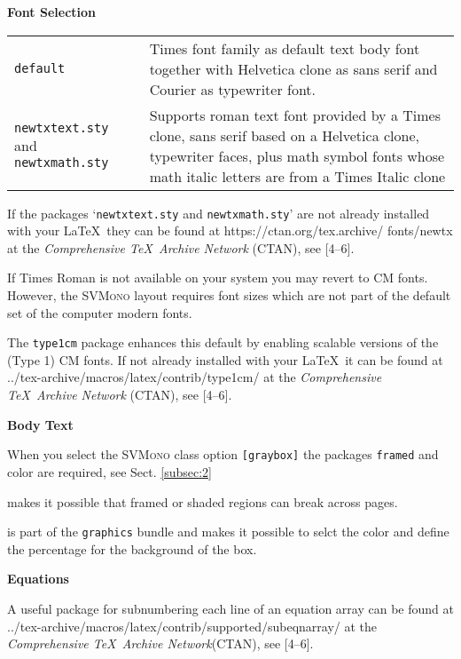 \documentclass[graybox,square]{svmono}
\begin{document}
\begin{sloppy}
\textbf{Font Selection}

\begin{tabular}{p{7.5pc}@{\qquad}p{18.5pc}}
\texttt{default} &Times font family as default text body font together with
Helvetica clone as sans serif and Courier as typewriter font.\\
\texttt{newtxtext.sty} and \texttt{newtxmath.sty} & Supports roman text font provided by a Times clone,  sans serif based on a Helvetica clone,  typewriter faces,  plus math symbol fonts whose math italic letters are from a Times Italic clone
\end{tabular}

If the packages `\texttt{newtxtext.sty} and \texttt{newtxmath.sty}' are not already installed
with your \LaTeX\ they can be found at https://ctan.org/tex.archive/ fonts/newtx at the \textit{Comprehensive \TeX\ Archive Network} (CTAN), see [4--6].


If Times Roman is not available on your system you may revert to CM fonts.
However, the \textsc{SVMono} layout requires font sizes which are not part of the
default set of the computer modern fonts.

\begin{description}
\item[\texttt{type1cm.sty}] The \texttt{type1cm} package enhances this default by enabling scalable versions of the (Type 1) CM fonts. If
not already installed with your \LaTeX\ it can be found
at ../tex-archive/\break macros/latex/contrib/type1cm/ at the
\textit{Comprehensive \TeX\ Archive Network} (CTAN), see [4--6].
\end{description}


\textbf{Body Text}


When you select the \textsc{SVMono} class option \texttt{[graybox]} the packages \texttt{framed} and
color are required, see Sect. \ref{subsec:2}

\begin{description}
\item[\texttt{framed.sty}] makes it possible that framed or shaded regions can
break across pages.
\item[\texttt{color.sty}] is part of the \texttt{graphics} bundle and makes it possible to
selct the color and define the percentage for the background of the box.
\end{description}


\textbf{Equations}


A useful package for subnumbering each line of an equation array can be found
at ../tex-archive/macros/latex/contrib/supported/subeqnarray/ at the \textit{Comprehensive \TeX\ Archive Network}(CTAN), see [4--6].


\end{sloppy}
\end{document}
